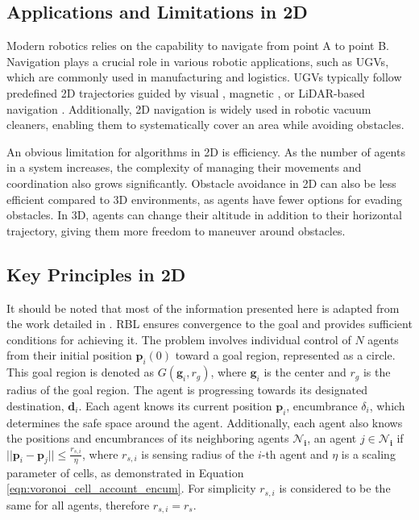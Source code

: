    \subsection{Applications and Limitations in 2D}
        Modern robotics relies on the capability to navigate from point A to point B.
        Navigation plays a crucial role in various robotic applications, such as \ac{UGV}s, which are commonly used in manufacturing and logistics. 
        \ac{UGV}s typically follow predefined 2D trajectories guided by visual \cite{vision_navigation}, magnetic \cite{magnetic_navigation}, or LiDAR-based navigation \cite{lidar_navigation}. 
        Additionally, 2D navigation is widely used in robotic vacuum cleaners, enabling them to systematically cover an area while avoiding obstacles.

        An obvious limitation for algorithms in 2D is efficiency. 
        As the number of agents in a system increases, the complexity of managing their movements and coordination also grows significantly.
        Obstacle avoidance in 2D can also be less efficient compared to 3D environments, as agents have fewer options for evading obstacles. 
        In 3D, agents can change their altitude in addition to their horizontal trajectory, giving them more freedom to maneuver around obstacles.

    \subsection{Key Principles in 2D}
        It should be noted that most of the information presented here is adapted from the work detailed in \cite{rbl_paper}.
        RBL ensures convergence to the goal and provides sufficient conditions for achieving it. 
        The problem involves individual control of $N$ agents from their initial position $\mathbf{p}_i(0)$ toward a goal region, represented as a circle.
        This goal region is denoted as $G(\mathbf{g}_i, r_g)$, where $\mathbf{g}_i$ is the center and $r_g$ is the radius of the goal region. 
        The agent is progressing towards its designated destination, $\mathbf{d}_i$.
        Each agent knows its current position $\mathbf{p}_i$, encumbrance $\delta_i$, which determines the safe space around the agent.
        Additionally, each agent also knows the positions and encumbrances of its neighboring agents $\mathbf{\mathcal{N}_i}$, an agent $j \in \mathbf{\mathcal{N}_i}$ if $||\mathbf{p}_i - \mathbf{p}_j|| \leq \frac{r_{s,i}}{\eta}$, where $r_{s,i}$ is sensing radius of the $i$-th agent and $\eta$ is a scaling parameter of cells, as demonstrated in Equation \eqref{eqn:voronoi_cell_account_encum}.
        For simplicity $r_{s,i}$ is considered to be the same for all agents, therefore $r_{s,i} = r_s$. 


